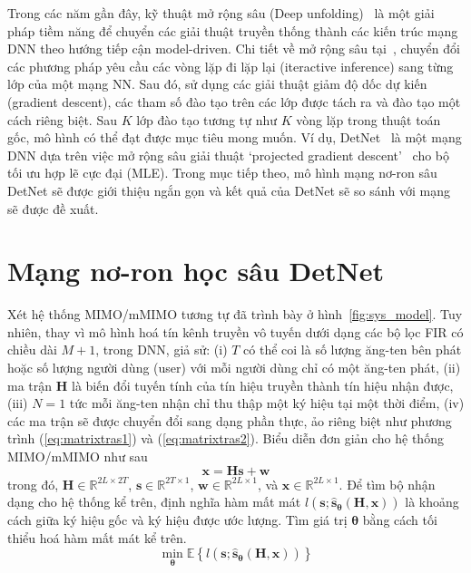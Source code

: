 Trong các năm gần đây, kỹ thuật mở rộng sâu (Deep unfolding)~\cite{Wisdom2016} là một giải pháp tiềm năng để chuyển các giải thuật truyền thống thành các kiến trúc mạng DNN theo hướng tiếp cận model-driven. Chi tiết về mở rộng sâu tại~\cite{John2014}, chuyển đổi các phương pháp yêu cầu các vòng lặp đi lặp lại (iteractive inference) sang từng lớp của một mạng NN. Sau đó, sử dụng các giải thuật giảm độ dốc dự kiến (gradient descent), các tham số đào tạo trên các lớp được tách ra và đào tạo một cách riêng biệt. Sau $K$ lớp đào tạo tương tự như $K$ vòng lặp trong thuật toán gốc, mô hình có thể đạt được mục tiêu mong muốn. Ví dụ, DetNet~\cite{Samuel2017} là một mạng DNN dựa trên việc mở rộng sâu giải thuật `projected gradient descent'~\cite{Chen2015} cho bộ tối ưu hợp lẽ cực đại (MLE). Trong mục tiếp theo, mô hình mạng nơ-ron sâu DetNet sẽ được giới thiệu ngắn gọn và kết quả của DetNet sẽ so sánh với mạng sẽ được đề xuất.

\section{Mạng nơ-ron học sâu DetNet}

Xét hệ thống MIMO/mMIMO tương tự đã trình bày ở hình~\ref{fig:sys_model}. Tuy nhiên, thay vì mô hình hoá tín kênh truyền vô tuyến dưới dạng các bộ lọc FIR có chiều dài $M+1$, trong DNN, giả sử: (i) $T$ có thể coi là số lượng ăng-ten bên phát hoặc số lượng người dùng (user) với mỗi người dùng chỉ có một ăng-ten phát, (ii) ma trận $\mathbf{H}$ là biến đổi tuyến tính của tín hiệu truyền thành tín hiệu nhận được, (iii) $N=1$ tức mỗi ăng-ten nhận chỉ thu thập một ký hiệu tại một thời điểm, (iv) các ma trận sẽ được chuyển đổi sang dạng phần thực, ảo riêng biệt như phương trình (\ref{eq:matrixtras1}) và (\ref{eq:matrixtras2}). Biểu diễn đơn giản cho hệ thống MIMO/mMIMO như sau
\begin{equation}
    \mathbf{x} = \mathbf{H} \mathbf{s} + \mathbf{w}
\end{equation}
trong đó, $\mathbf{H} \in \mathbb{R}^{2L \times 2T}$, $\mathbf{s} \in \mathbb{R}^{2T \times 1}$, $\mathbf{w} \in \mathbb{R}^{2L \times 1}$, và $\mathbf{x} \in \mathbb{R}^{2L \times 1}$. Để tìm bộ nhận dạng cho hệ thống kể trên, định nghĩa hàm mất mát $l\left(\mathbf{s} ; \hat{\mathbf{s}}_{\boldsymbol{\theta}}(\mathbf{H}, \mathbf{x})\right)$ là khoảng cách giữa ký hiệu gốc và ký hiệu được ước lượng. Tìm giá trị $\mathbf{\theta}$ bằng cách tối thiểu hoá hàm mất mát kể trên.
\begin{equation}
\label{eq:lossf}
\min _{\boldsymbol{\theta}} \mathbb{E}\left\{l\left(\mathbf{s} ; \hat{\mathbf{s}}_{\boldsymbol{\theta}}(\mathbf{H}, \mathbf{x})\right)\right\}
\end{equation}


